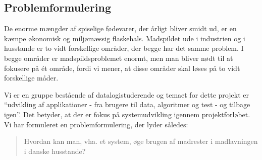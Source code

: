 \subsection{Problemformulering}
\label{subsec:problemformulering}

De enorme mængder af spiselige fødevarer, der årligt bliver smidt ud, er en kæmpe økonomisk og miljømæssig flaskehals. Madspildet ude i industrien og i husstande er to vidt forskellige områder, der begge har det samme problem. I begge områder er madspildsproblemet enormt, men man bliver nødt til at fokusere på ét område, fordi vi mener, at disse områder skal løses på to vidt forskellige måder. 

Vi er en gruppe bestående af datalogistuderende og temaet for dette projekt er ``udvikling af applikationer - fra brugere til data, algoritmer og test - og tilbage igen''. Det betyder, at der er fokus på systemudvikling igennem projektforløbet. Vi har formuleret en problemformulering, der lyder således:

\begin{quote}
Hvordan kan man, vha. et system, øge brugen af madrester i madlavningen i danske husstande?
\end{quote} 
